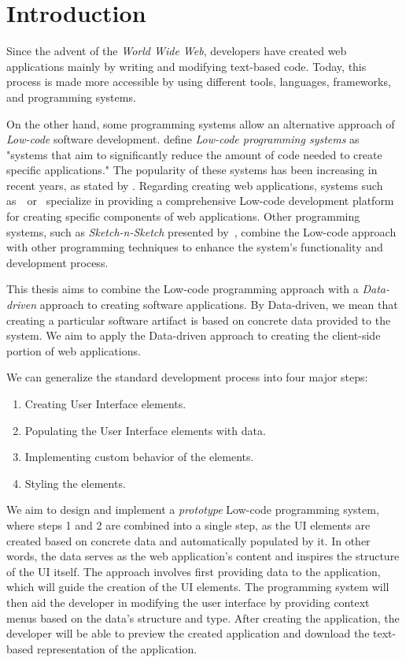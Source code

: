 \chapter*{Introduction}

Since the advent of the \emph{World Wide Web}, developers have created web applications mainly by writing and modifying text-based code.
Today, this process is made more accessible by using different tools, languages, frameworks, and programming systems.

On the other hand, some programming systems allow an alternative approach of \emph{Low-code} software development.
\citet{Pinho_Aguiar_Amaral_2023} define \emph{Low-code programming systems} as "systems that aim to significantly reduce the amount of code needed to create specific applications."
The popularity of these systems has been increasing in recent years, as stated by \citet{Sahay_Indamutsa_Di}.
Regarding creating web applications, systems such as~\citet{mendix}~or~\citet{darklang} specialize in providing a comprehensive Low-code development platform for creating specific components of web applications.
Other programming systems, such as \emph{Sketch-n-Sketch} presented by~\citet{sketch-and-sketch}, combine the Low-code approach
with other programming techniques to enhance the system's functionality and development process.

This thesis aims to combine the Low-code programming approach with a \emph{Data-driven} approach to creating software applications.
By Data-driven, we mean that creating a particular software artifact is based on concrete data provided to the system.
We aim to apply the Data-driven approach to creating the client-side portion of web applications.

We can generalize the standard development process into four major steps:
\begin{enumerate}
	\item Creating User Interface elements.
	\item Populating the User Interface elements with data.
	\item Implementing custom behavior of the elements.
	\item Styling the elements.
\end{enumerate}
We aim to design and implement a \emph{prototype} Low-code programming system, where steps 1 and 2 are combined into a single step, as the UI elements are created based on concrete data and automatically populated by it.
In other words, the data serves as the web application's content and inspires the structure of the UI itself.
The approach involves first providing data to the application, which will guide the creation of the UI elements.
The programming system will then aid the developer in modifying the user interface by providing context menus based on the data's structure and type.
After creating the application, the developer will be able to preview the created application and download the text-based representation of the application.

